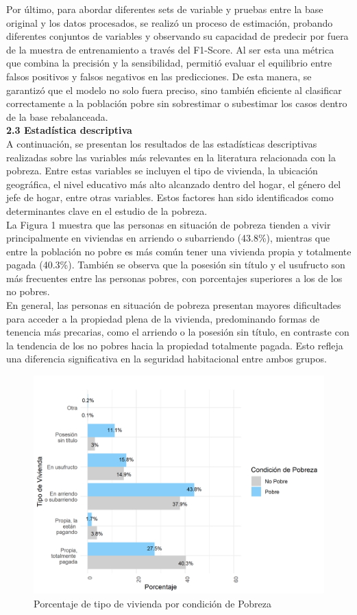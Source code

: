 \documentclass[a4paper]{article}
\theoremstyle{remark}
\theoremstyle{definition}
\begin{document}
Por último, para abordar diferentes sets de variable y pruebas entre la base original y los datos procesados, se realizó un proceso de estimación, probando diferentes conjuntos de variables y observando su capacidad de predecir por fuera de la muestra de entrenamiento a través del F1-Score. Al ser esta una métrica que combina la precisión y la sensibilidad, permitió evaluar el equilibrio entre falsos positivos y falsos negativos en las predicciones. De esta manera, se garantizó que el modelo no solo fuera preciso, sino también eficiente al clasificar correctamente a la población pobre sin sobrestimar o subestimar los casos dentro de la base rebalanceada.\\



\textbf{2.3 Estadística descriptiva}\\


A continuación, se presentan los resultados de las estadísticas descriptivas realizadas sobre las variables más relevantes en la literatura relacionada con la pobreza. Entre estas variables se incluyen el tipo de vivienda, la ubicación geográfica, el nivel educativo más alto alcanzado dentro del hogar, el género del jefe de hogar, entre otras variables. Estos factores han sido identificados como determinantes clave en el estudio de la pobreza. \\


La Figura 1 muestra que las personas en situación de pobreza tienden a vivir principalmente en viviendas en arriendo o subarriendo (43.8\%), mientras que entre la población no pobre es más común tener una vivienda propia y totalmente pagada (40.3\%). También se observa que la posesión sin título y el usufructo son más frecuentes entre las personas pobres, con porcentajes superiores a los de los no pobres.\\

En general, las personas en situación de pobreza presentan mayores dificultades para acceder a la propiedad plena de la vivienda, predominando formas de tenencia más precarias, como el arriendo o la posesión sin título, en contraste con la tendencia de los no pobres hacia la propiedad totalmente pagada. Esto refleja una diferencia significativa en la seguridad habitacional entre ambos grupos.\\


    \begin{figure}[H]
        \centering
            \caption{Porcentaje de tipo de vivienda por condición de Pobreza}
        \includegraphics[width=0.6\linewidth]{Graficas/tipo_vivienda.png}
    \end{figure}
\end{document}
